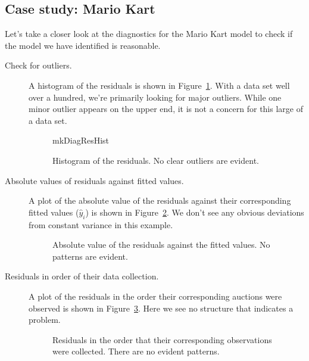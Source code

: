 \subsection{Case study: Mario Kart}

\noindent%
Let's take a closer look at the diagnostics for the Mario Kart
model to check if the model we have identified is reasonable.

\begin{description}
\item[Check for outliers.]
    A histogram of the residuals is shown in
    Figure~\ref{mkDiagResHist}.
    With a data set well over a hundred, we're primarily
    looking for major outliers.
    While one minor outlier appears on the upper end,
    it is not a concern for this large of a data set.

\begin{figure}[h]
  \centering
      {mkDiagResHist}
  \caption{Histogram of the residuals.
      No clear outliers are evident.}
  \label{mkDiagResHist}
\end{figure}

\item[Absolute values of residuals against fitted values.]
    A plot of the absolute value of the residuals against
    their corresponding fitted values ($\hat{y}_i$) is shown
    in Figure~\ref{mkDiagnosticEvsAbsF}.
    We don't see any obvious deviations from constant variance
    in this example.

\begin{figure}
  \centering
  \caption{Absolute value of the residuals against
      the fitted values.
      No patterns are evident.}
  \label{mkDiagnosticEvsAbsF}
\end{figure}

\item[Residuals in order of their data collection.]
    A plot of the residuals in the order their corresponding
    auctions were observed is shown in
    Figure~\ref{mkDiagnosticInOrder}.
    Here we see no structure that indicates a problem.

\begin{figure}[h]
  \centering
  \caption{Residuals in the order that their
      corresponding observations were collected.
      There are no evident patterns.}
  \label{mkDiagnosticInOrder}
\end{figure}


\end{description}

